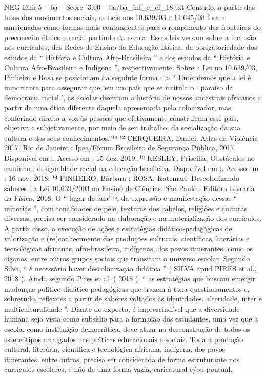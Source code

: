 \begin{textsample}{NEG Dim 5 – ba – Score -3.00 – ba/ba\_inf\_e\_ef\_18.txt}
Contudo, a partir das lutas dos movimentos sociais, as Leis nos 10.639/03 e 11.645/08 foram sancionadas como formas mais contundentes para o rompimento das fronteiras do preconceito étnico e racial partindo da escola.
Essas leis versam sobre a inclusão nos currículos, das Redes de Ensino da Educação Básica, da obrigatoriedade dos estudos da “ História e Cultura Afro-Brasileira ” e dos estudos da “ História e Cultura Afro-Brasileira e Indígena ”, respectivamente.
Sobre a Lei no 10.639/03, Pinheiro e Rosa se posicionam da seguinte forma : > “ Entendemos que a lei é importante para assegurar que, em um país que se intitula o ‘ paraíso da democracia racial ’, as escolas discutam a história de nossos ancestrais africanos a partir de uma ótica diferente daquela apresentada pelo colonizador, mas conferindo direito a voz às pessoas que efetivamente construíram esse país, objetiva e subjetivamente, por meio de seu trabalho, da socialização da sua cultura e dos seus conhecimentos.”¹⁴ ¹² CERQUEIRA, Daniel.
Atlas da Violência 2017.
Rio de Janeiro : Ipea/Fórum Brasileiro de Segurança Pública, 2017.
Disponível em :.
Acesso em : 15 dez. 2019. ¹³ KESLEY, Priscilla.
Obstáculos no caminho : desigualdade racial na educação brasileira.
Disponível em :.
Acesso em : 16 nov. 2018. ¹⁴ PINHEIRO, Bárbara ; ROSA, Katemari.
Descolonizando saberes : a Lei 10.639/2003 no Ensino de Ciências.
São Paulo : Editora Livraria da Física, 2018.
O “ lugar de fala”¹⁵, da expressão e manifestação dessas “ minorias ”, com tonalidades de pele, texturas dos cabelos, religiões e culturas diversas, precisa ser considerado na elaboração e na materialização dos currículos.
A partir disso, a execução de ações e estratégias didático-pedagógicas de valorização e (re)conhecimento das produções culturais, científicas, literárias e tecnológicas africanas, afro-brasileira, indígenas, dos povos itinerantes, como os ciganos, entre outros grupos sociais que transitam o universo escolar.
Segundo Silva, “ é necessário haver descolonização didática ” ( SILVA apud PIRES et al., 2018 ).
Ainda segundo Pires et al. ( 2018 ), “ as estratégias que buscam emergir mudanças político-didático-pedagógicas que trazem à tona questionamentos e, sobretudo, reflexões a partir de saberes voltados às identidades, alteridade, inter e multiculturalidade ”.
Diante do exposto, é imprescindível que a diversidade humana seja vista como subsídio para a formação dos estudantes, uma vez que a escola, como instituição democrática, deve atuar na desconstrução de todos os estereótipos arraigados nas práticas educacionais e sociais.
Toda a produção cultural, literária, científica e tecnológica africana, indígena, dos povos itinerantes, entre outros, precisa ser considerada de forma estruturante nos currículos escolares, e não de uma forma vazia, caricatural e/ou pontual.

\end{textsample}
